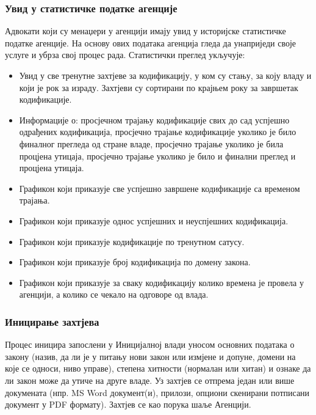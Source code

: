 \documentclass[12pt,a4paper]{article}
\newcommand{\bonus}[1]{\textcolor{emerald}{#1}}
\begin{document}
\subsubsection{Увид у статистичке податке агенције}

\bonus{Адвокати који су менаџери у агенцији имају увид у историјске статистичке податке агенције. На основу ових података агенција гледа да унаприједи своје услуге и убрза свој процес рада. Статистички преглед укључује:}

\begin{itemize}
    \item \bonus{Увид у све тренутне захтјеве за кодификацију, у ком су стању, за коју владу и који је рок за израду. Захтјеви су сортирани по крајњем року за завршетак кодификације.}
    \item \bonus{Информације о: просјечном трајању кодификације свих до сад успјешно одрађених кодификација, просјечно трајање кодификације уколико је било финалног прегледа од стране владе, просјечно трајање уколико је била процјена утицаја, просјечно трајање уколико је било и финални преглед и процјена утицаја.}
    \item \bonus{Графикон који приказује све успјешно завршене кодификације са временом трајања.}
    \item \bonus{Графикон који приказује однос успјешних и неуспјешних кодификација.}
    \item \bonus{Графикон који приказује кодификације по тренутном сатусу.}
    \item \bonus{Графикон који приказује број кодификација по домену закона.}
    \item \bonus{Графикон који приказује за сваку кодификацију колико времена је провела у агенцији, а колико се чекало на одговоре од влада.}
\end{itemize}

\subsubsection{Иницирање захтјева}

Процес иницира запослени у Иницијалној влади уносом основних података о закону (назив, да ли је у питању нови закон или измјене и допуне, домени на које се односи, ниво управе), степена хитности (нормалан или хитан) и ознаке да ли закон може да утиче на друге владе. Уз захтјев се отпрема један или више докумената (нпр. MS Word документ(и), прилози, опциони скенирани потписани документ у PDF формату). Захтјев се као порука шаље Агенцији.
\end{document}

